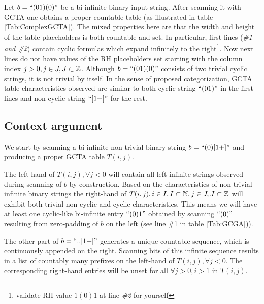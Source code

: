 Let $b=\text{``}(01)(0)\text{''}$ be a bi-infinite binary input string. After scanning it with GCTA one obtains a proper countable table (as illustrated in table \ref{Tab:ComplexGCTA}). The mixed properties here are that the width and height of the table placeholders is both countable and set. In particular, first lines (\textit{\#1 and \#2}) contain cyclic formulas which expand infinitely to the right\footnote{validate RH value $1(0)1$ at line \textit{\#2} for yourself}. Now next lines do not have values of the RH placeholders set starting with the column index $j > 0, j \in J, J \subset \mathbb{Z}$. Although $b=\text{``}(01)(0)\text{''}$ consists of two trivial cyclic strings, it is not trivial by itself. In the sense of proposed categorization, GCTA table characteristics observed are similar to both cyclic string $\text{``}(01)\text{''}$ in the first lines and non-cyclic string $\text{``}[1+]\text{''}$ for the rest.

\subsection{Context argument}

We start by scanning a bi-infinite non-trivial binary string $b = \text{``}(0)[1+]\text{''} $ and producing a proper GCTA table $T(i,j)$.

The left-hand of $T(i,j),  \forall j < 0$ will contain all left-infinite strings  observed during scanning of $b$ by construction. Based on the characteristics of non-trivial infinite binary strings the right-hand of $T(i,j),i \in I, I \subset \mathbb{N}, j \in J, J \subset \mathbb{Z}$ will exhibit both trivial non-cyclic and cyclic characteristics. This means we will have at least one cyclic-like bi-infinite entry $\text{``}(0)1\text{''}$ obtained by scanning $\text{``}(0)\text{''}$ resulting from zero-padding of $b$ on the left (see line \#1 in table \ref{Tab:GCGA})).

The other part of $b = \text{``}..[1+]\text{''} $ generates a unique countable sequence, which is continuously appended on the right. Scanning bits of this infinite sequence results in a list of countably many prefixes on the left-hand of $T(i,j),  \forall j < 0$. The corresponding right-hand entries will be unset for all $\forall j > 0, i > 1$  in $T(i,j)$.


